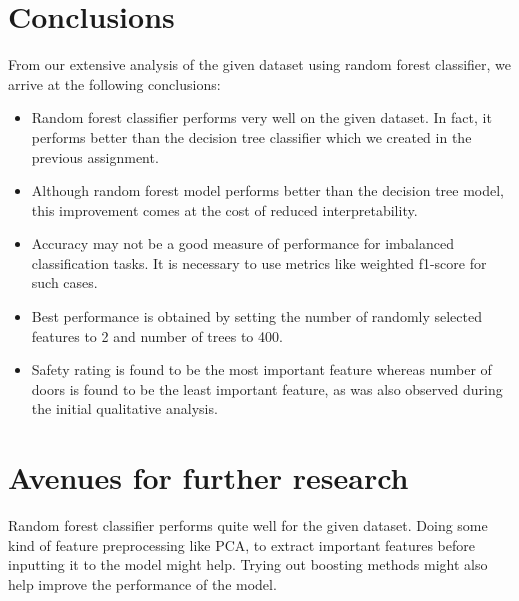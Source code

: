 \documentclass[conference]{IEEEtran}
\begin{document}
\section{Conclusions}

From our extensive analysis of the given dataset using random forest classifier, we arrive at the following conclusions:

\begin{itemize}
    \item Random forest classifier performs very well on the given dataset. In fact, it performs better than the decision tree classifier which we created in the previous assignment. 
    \item Although random forest model performs better than the decision tree model, this improvement comes at the cost of reduced interpretability.
    \item Accuracy may not be a good measure of performance for imbalanced classification tasks. It is necessary to use metrics like weighted f1-score for such cases.
    \item Best performance is obtained by setting the number of randomly selected features to 2 and number of trees to 400.
    \item Safety rating is found to be the most important feature whereas number of doors is found to be the least important feature, as was also observed during the initial qualitative analysis.
\end{itemize}



\section{Avenues for further research}

Random forest classifier performs quite well for the given dataset. Doing some kind of feature preprocessing like PCA, to extract important features before inputting it to the model might help. Trying out boosting methods might also help improve the performance of the model.  



\nocite{*} %

\end{document}
